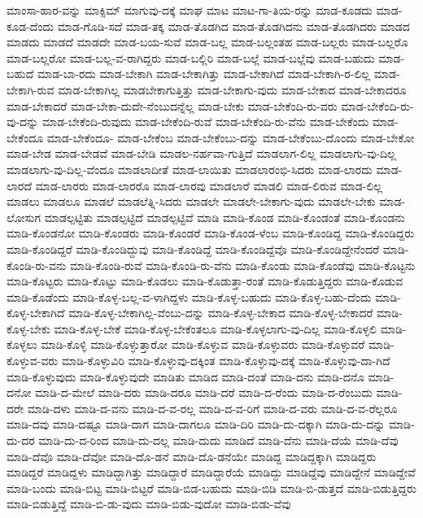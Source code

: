 {ಮಾಂಸಾ-ಹಾರ-ವನ್ನು
ಮಾಕ್ಸಿಮ್
ಮಾಗುವು-ದಕ್ಕೆ
ಮಾಘ
ಮಾಟ
ಮಾಟ-ಗಾ-ತಿಯ-ರನ್ನು
ಮಾಡ-ಕೂಡದು
ಮಾಡ-ಕೂಡ-ದೆಂದು
ಮಾಡ-ಗೊಡಿ-ಸದೆ
ಮಾಡ-ತಕ್ಕ
ಮಾಡ-ತೊಡಗಿದ
ಮಾಡ-ತೊಡಗಿದನು
ಮಾಡ-ತೊಡಗಿದರು
ಮಾಡದ
ಮಾಡದು
ಮಾಡದೆ
ಮಾಡದೇ
ಮಾಡ-ಬಯ-ಸುವೆ
ಮಾಡ-ಬಲ್ಲ
ಮಾಡ-ಬಲ್ಲಂತಹ
ಮಾಡ-ಬಲ್ಲರು
ಮಾಡ-ಬಲ್ಲರೊ
ಮಾಡ-ಬಲ್ಲರೋ
ಮಾಡ-ಬಲ್ಲ-ವ-ರಾಗಿದ್ದರು
ಮಾಡ-ಬಲ್ಲಿರಿ
ಮಾಡ-ಬಲ್ಲೆ
ಮಾಡ-ಬಲ್ಲೆವು
ಮಾಡ-ಬಹುದು
ಮಾಡ-ಬಹುದೆ
ಮಾಡ-ಬಾ-ರದು
ಮಾಡ-ಬೇಕಾಗಿ
ಮಾಡ-ಬೇಕಾಗಿತ್ತು
ಮಾಡ-ಬೇಕಾಗಿದೆ
ಮಾಡ-ಬೇಕಾಗಿ-ರ-ಲಿಲ್ಲ
ಮಾಡ-ಬೇಕಾಗಿ-ರುವ
ಮಾಡ-ಬೇಕಾಗಿಲ್ಲ
ಮಾಡಬೇಕಾಗುತ್ತಿತ್ತು
ಮಾಡ-ಬೇಕಾಗು-ವುದು
ಮಾಡ-ಬೇಕಾದ
ಮಾಡ-ಬೇಕಾದರೂ
ಮಾಡ-ಬೇಕಾದರೆ
ಮಾಡ-ಬೇಕಾ-ದುದೇ-ನೆಂಬುದನ್ನೆಲ್ಲ
ಮಾಡ-ಬೇಕು
ಮಾಡ-ಬೇಕೆಂದಿ-ರು-ವರು
ಮಾಡ-ಬೇಕೆಂದಿ-ರು-ವು-ದನ್ನು
ಮಾಡ-ಬೇಕೆಂದಿ-ರುವುದು
ಮಾಡ-ಬೇಕೆಂದಿ-ರುವೆ
ಮಾಡ-ಬೇಕೆಂದಿ-ರು-ವೆನು
ಮಾಡ-ಬೇಕೆಂದು
ಮಾಡ-ಬೇಕೆಂದೂ
ಮಾಡ-ಬೇಕೆಂದೂ-
ಮಾಡ-ಬೇಕೆಂಬ
ಮಾಡ-ಬೇಕೆಂಬು-ದನ್ನು
ಮಾಡ-ಬೇಕೆಂಬು-ದೊಂದು
ಮಾಡ-ಬೇಕೋ
ಮಾಡ-ಬೇಡ
ಮಾಡ-ಬೇಡವೆ
ಮಾಡ-ಬೇಡಿ
ಮಾಡಲ-ನರ್ಹವಾ-ಗುತ್ತಿದೆ
ಮಾಡಲಾಗ-ಲಿಲ್ಲ
ಮಾಡಲಾಗು-ವು-ದಿಲ್ಲ
ಮಾಡಲಾಗು-ವು-ದಿಲ್ಲ-ವೆಂದೂ
ಮಾಡಲಾದೀತೆ
ಮಾಡ-ಲಾಯಿತು
ಮಾಡಲಾರಂಭಿ-ಸಿದರು
ಮಾಡ-ಲಾರದು
ಮಾಡ-ಲಾರದೆ
ಮಾಡ-ಲಾರರು
ಮಾಡ-ಲಾರರೊ
ಮಾಡ-ಲಾರವು
ಮಾಡಲಾರೆ
ಮಾಡಲಿ
ಮಾಡ-ಲಿರುವ
ಮಾಡ-ಲಿಲ್ಲ
ಮಾಡಲು
ಮಾಡಲೂ
ಮಾಡಲೆ
ಮಾಡಲೆತ್ನಿ-ಸಿದರು
ಮಾಡಲೇ
ಮಾಡಲೇ-ಬೇಕಾಗು-ವುದು
ಮಾಡಲೇ-ಬೇಕು
ಮಾಡ-ಲೋಸುಗ
ಮಾಡಲ್ಪಟ್ಟಿತು
ಮಾಡಲ್ಪಟ್ಟಿದೆ
ಮಾಡಲ್ಪಟ್ಟಿವೆ
ಮಾಡಿ
ಮಾಡಿ-ಕೊಂಡ
ಮಾಡಿ-ಕೊಂಡಂತೆ
ಮಾಡಿ-ಕೊಂಡನು
ಮಾಡಿ-ಕೊಂಡನೋ
ಮಾಡಿ-ಕೊಂಡರು
ಮಾಡಿ-ಕೊಂಡರೆ
ಮಾಡಿ-ಕೊಂಡ-ಳೆಂಬ
ಮಾಡಿ-ಕೊಂಡಿದ್ದ
ಮಾಡಿ-ಕೊಂಡಿದ್ದರು
ಮಾಡಿ-ಕೊಂಡಿದ್ದರೆ
ಮಾಡಿ-ಕೊಂಡಿದ್ದುವು
ಮಾಡಿ-ಕೊಂಡಿದ್ದೆ
ಮಾಡಿ-ಕೊಂಡಿದ್ದೆವೊ
ಮಾಡಿ-ಕೊಂಡಿದ್ದೇನೆಂದರೆ
ಮಾಡಿ-ಕೊಂಡಿ-ರು-ವನು
ಮಾಡಿ-ಕೊಂಡಿ-ರುವೆ
ಮಾಡಿ-ಕೊಂಡಿ-ರು-ವೆನು
ಮಾಡಿ-ಕೊಂಡು
ಮಾಡಿ-ಕೊಂಡೆವು
ಮಾಡಿ-ಕೊಟ್ಟನು
ಮಾಡಿ-ಕೊಟ್ಟರು
ಮಾಡಿ-ಕೊಟ್ಟು
ಮಾಡಿ-ಕೊಡಲು
ಮಾಡಿ-ಕೊಡುತ್ತಾ-ರಂತೆ
ಮಾಡಿ-ಕೊಡುತ್ತಿದ್ದರು
ಮಾಡಿ-ಕೊಡುವ
ಮಾಡಿ-ಕೊಡೆಂದು
ಮಾಡಿ-ಕೊಳ್ಳ-ಬಲ್ಲ-ವ-ಳಾಗಿದ್ದಳು
ಮಾಡಿ-ಕೊಳ್ಳ-ಬಹುದು
ಮಾಡಿ-ಕೊಳ್ಳ-ಬಹು-ದೆಂದು
ಮಾಡಿ-ಕೊಳ್ಳ-ಬೇಕಾಗಿದೆ
ಮಾಡಿ-ಕೊಳ್ಳ-ಬೇಕಾಗಿಲ್ಲ-ವೆಂಬು-ದನ್ನು
ಮಾಡಿ-ಕೊಳ್ಳ-ಬೇಕಾದ
ಮಾಡಿ-ಕೊಳ್ಳ-ಬೇಕಾದರೆ
ಮಾಡಿ-ಕೊಳ್ಳ-ಬೇಕು
ಮಾಡಿ-ಕೊಳ್ಳ-ಬೇಕೆ
ಮಾಡಿ-ಕೊಳ್ಳ-ಬೇಕೆಂತಲೂ
ಮಾಡಿ-ಕೊಳ್ಳಲಾಗು-ವು-ದಿಲ್ಲ
ಮಾಡಿ-ಕೊಳ್ಳಲಿ
ಮಾಡಿ-ಕೊಳ್ಳಲು
ಮಾಡಿ-ಕೊಳ್ಳಿ
ಮಾಡಿ-ಕೊಳ್ಳುತ್ತಾರೋ
ಮಾಡಿ-ಕೊಳ್ಳುವ
ಮಾಡಿ-ಕೊಳ್ಳುವರು
ಮಾಡಿ-ಕೊಳ್ಳುವರೆ
ಮಾಡಿ-ಕೊಳ್ಳುವ-ವರು
ಮಾಡಿ-ಕೊಳ್ಳುವಿರಿ
ಮಾಡಿ-ಕೊಳ್ಳುವು-ದಕ್ಕಿಂತ
ಮಾಡಿ-ಕೊಳ್ಳುವು-ದಕ್ಕೆ
ಮಾಡಿ-ಕೊಳ್ಳುವು-ದಾ-ಗಿದೆ
ಮಾಡಿ-ಕೊಳ್ಳುವುದು
ಮಾಡಿ-ಕೊಳ್ಳುವುದೇ
ಮಾಡಿತು
ಮಾಡಿದ
ಮಾಡಿ-ದಂತೆ
ಮಾಡಿ-ದನು
ಮಾಡಿ-ದನೊ
ಮಾಡಿ-ದನೋ
ಮಾಡಿ-ದ-ಮೇಲೆ
ಮಾಡಿ-ದರು
ಮಾಡಿ-ದರೂ
ಮಾಡಿ-ದರೆ
ಮಾಡಿ-ದ-ರೆಂದು
ಮಾಡಿ-ದ-ರೆಂಬುದು
ಮಾಡಿ-ದರೇ
ಮಾಡಿ-ದಳು
ಮಾಡಿ-ದ-ವನು
ಮಾಡಿ-ದ-ವ-ರಲ್ಲ
ಮಾಡಿ-ದ-ವ-ರಿಗೆ
ಮಾಡಿ-ದ-ವರು
ಮಾಡಿ-ದ-ವ-ರೆಲ್ಲರೂ
ಮಾಡಿ-ದವು
ಮಾಡಿ-ದಷ್ಟೂ
ಮಾಡಿ-ದಾಗ
ಮಾಡಿ-ದಾಗಲೂ
ಮಾಡಿ-ದಿರಿ
ಮಾಡಿ-ದು-ದಕ್ಕಾಗಿ
ಮಾಡಿ-ದು-ದನ್ನು
ಮಾಡಿ-ದು-ದರ
ಮಾಡಿ-ದು-ದ-ರಿಂದ
ಮಾಡಿ-ದು-ದಲ್ಲ
ಮಾಡಿ-ದುದು
ಮಾಡಿದೆ
ಮಾಡಿ-ದೆನು
ಮಾಡಿ-ದೆಯೆ
ಮಾಡಿ-ದೆವು
ಮಾಡಿ-ದೆವೊ
ಮಾಡಿ-ದೆವೋ
ಮಾಡಿ-ದೊ-ಡನೆ
ಮಾಡಿ-ದೊ-ಡನೆಯೇ
ಮಾಡಿದ್ದ
ಮಾಡಿದ್ದಕ್ಕಾಗಿ
ಮಾಡಿದ್ದರು
ಮಾಡಿದ್ದರೆ
ಮಾಡಿದ್ದಳು
ಮಾಡಿದ್ದಾಗಿತ್ತು
ಮಾಡಿದ್ದಾರೆ
ಮಾಡಿದ್ದಾರೆಯೆ
ಮಾಡಿದ್ದು
ಮಾಡಿದ್ದೆವು
ಮಾಡಿದ್ದೇನೆ
ಮಾಡಿದ್ದೇವೆ
ಮಾಡಿ-ಬಂದು
ಮಾಡಿ-ಬಿಟ್ಟ
ಮಾಡಿ-ಬಿಟ್ಟರೆ
ಮಾಡಿ-ಬಿಡ-ಬಹುದು
ಮಾಡಿ-ಬಿಡಿ
ಮಾಡಿ-ಬಿ-ಡುತ್ತದೆ
ಮಾಡಿ-ಬಿಡುತ್ತಿದ್ದರು
ಮಾಡಿ-ಬಿಡುತ್ತಿದ್ದೆ
ಮಾಡಿ-ಬಿ-ಡು-ವುದು
ಮಾಡಿ-ಬಿಡು-ವುದೋ
ಮಾಡಿ-ಬಿಡು-ವೆವು
}
